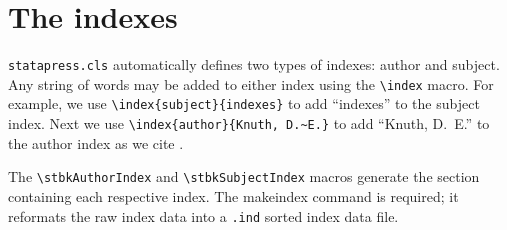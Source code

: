 
\section{The indexes}

\texttt{statapress.cls} automatically defines two types of indexes:  author
and subject.  Any string of words may be added to either index using the
\verb+\index+ macro.  For example, we use \verb+\index{subject}{indexes}+ to
add ``indexes''
%
%
to the subject index.  Next we use%
%
\verb+\index{author}{Knuth, D.~E.}+
%
to add ``Knuth, D.~E.''
%
%
to the author index as we cite \cite{texbook}.

The \verb+\stbkAuthorIndex+ and \verb+\stbkSubjectIndex+ macros generate
the section containing each respective index.  The \textsf{makeindex}
command is required; it reformats the raw index data into a \texttt{.ind}
sorted index data file.

\endinput
